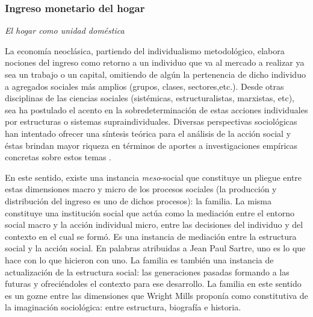 	\subsubsection{Ingreso monetario del hogar}
	
	\textit{El hogar como unidad doméstica}
	
	La economía neoclásica, partiendo del individualismo metodológico, elabora nociones del ingreso como retorno a un individuo que va al mercado a realizar ya sea un trabajo o un capital, omitiendo de algún la pertenencia de dicho individuo a agregados sociales más amplios (grupos, clases, sectores,etc.). Desde otras disciplinas de las ciencias sociales (sistémicas, estructuralistas, marxistas, etc), sea ha postulado el acento en la sobredeterminación de estas acciones individuales por estructuras o sistemas supraindividuales. Diversas perspectivas sociológicas han intentado ofrecer una síntesis teórica para el análisis de la acción social \cite{bourdieu1991,bourdieu2001} y éstas brindan mayor riqueza en términos de aportes a investigaciones empíricas concretas sobre estos temas \cite{soja}.
	
	En este sentido, existe una instancia \textit{meso}-social que constituye un pliegue entre estas dimensiones macro y micro de los procesos sociales (la producción y distribución del ingreso es uno de dichos procesos): la familia. La misma constituye una institución social que actúa como la mediación entre el entorno social macro y la acción individual micro, entre las decisiones del individuo y del contexto en el cual se formó. Es una instancia de mediación entre la estructura social y la acción social. En palabras atribuidas a Jean Paul Sartre, uno es lo que hace con lo que hicieron con uno. La familia es también una instancia de actualización de la estructura social: las generaciones pasadas formando a las futuras y ofreciéndoles el contexto para ese desarrollo. La familia en este sentido es un gozne entre las dimensiones que Wright Mills \citeyear{wrightmills} proponía como constitutiva de la imaginación sociológica: entre estructura, biografía e historia.
	
